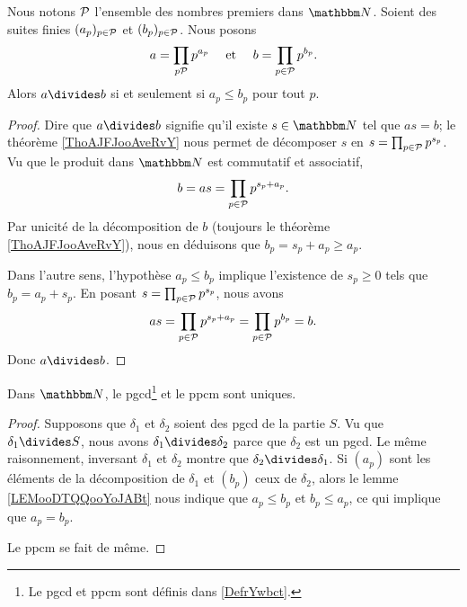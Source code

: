 \begin{lemma}        \label{LEMooDTQQooYoJABt}
    Nous notons \( \mathcal{P}\) l'ensemble des nombres premiers dans \( \eN\). Soient des suites finies \( (a_p)_{p\in \mathcal{P}}\) et \( (b_p)_{p\in \mathcal{P}}\). Nous posons
    \begin{equation}
        \begin{aligned}[]
            a&=\prod_{ p\mP}p^{a_p}&\text{ et }&&b=\prod_{ p\in \mP}p^{b_p}.
        \end{aligned}
    \end{equation}
    Alors \( a\divides b\) si et seulement si \( a_p\leq b_p\) pour tout \( p\).
\end{lemma}

\begin{proof}
    Dire que \( a\divides b\) signifie qu'il existe \( s\in \eN\) tel que \( as=b\); le théorème \ref{ThoAJFJooAveRvY} nous permet de décomposer \( s\) en \( s=\prod_{p\in\mathcal{P}}p^{s_p}\). Vu que le produit dans \( \eN\) est commutatif et associatif,
    \begin{equation}
        b=as=\prod_{p\in\mathcal{P}}p^{s_p+a_p}.
    \end{equation}
    Par unicité de la décomposition de \( b\) (toujours le théorème \ref{ThoAJFJooAveRvY}), nous en déduisons que \( b_p=s_p+a_p\geq a_p\).

    Dans l'autre sens, l'hypothèse \( a_p\leq b_p\) implique l'existence de \( s_p\geq 0\) tels que \( b_p=a_p+s_p\). En posant \( s=\prod_{p\in\mathcal{P}}p^{s_p}\), nous avons
    \begin{equation}
        as=\prod_{p\in\mathcal{P}}p^{s_p+a_p}=\prod_{p\in \mathcal{P}}p^{b_p}=b.
    \end{equation}
    Donc \( a\divides b\).
\end{proof}

\begin{lemma}       \label{LEMooBJVJooFyuFeN}
    Dans \( \eN\), le pgcd\footnote{Le pgcd et ppcm sont définis dans \ref{DefrYwbct}.} et le ppcm sont uniques.
\end{lemma}

\begin{proof}
    Supposons que \( \delta_1\) et \( \delta_2\) soient des pgcd de la partie \( S\). Vu que \( \delta_1\divides S\), nous avons \( \delta_1\divides \delta_2\) parce que \( \delta_2\) est un pgcd. Le même raisonnement, inversant \( \delta_1\) et \( \delta_2\) montre que \( \delta_2\divides \delta_1\). Si \( (a_p)\) sont les éléments de la décomposition de \( \delta_1\) et \( (b_p)\) ceux de \( \delta_2\), alors le lemme \ref{LEMooDTQQooYoJABt} nous indique que \( a_p\leq b_p\) et \( b_p\leq a_p\), ce qui implique que \( a_p=b_p\).

    Le ppcm se fait de même.
\end{proof}

